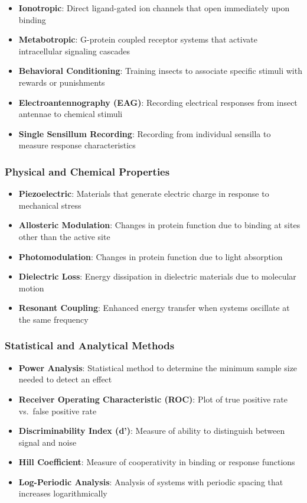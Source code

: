 \documentclass[
  13pt,
  a4paperpaper,
  12pt]{article}
\providecommand{\tightlist}{%
  \setlength{\itemsep}{0pt}\setlength{\parskip}{0pt}}
\begin{document}
\begin{itemize}
\tightlist
\item
  \textbf{Ionotropic}: Direct ligand-gated ion channels that open
  immediately upon binding
\item
  \textbf{Metabotropic}: G-protein coupled receptor systems that
  activate intracellular signaling cascades
\item
  \textbf{Behavioral Conditioning}: Training insects to associate
  specific stimuli with rewards or punishments
\item
  \textbf{Electroantennography (EAG)}: Recording electrical responses
  from insect antennae to chemical stimuli
\item
  \textbf{Single Sensillum Recording}: Recording from individual
  sensilla to measure response characteristics
\end{itemize}

\subsubsection{Physical and Chemical
Properties}\label{physical-and-chemical-properties}

\begin{itemize}
\tightlist
\item
  \textbf{Piezoelectric}: Materials that generate electric charge in
  response to mechanical stress
\item
  \textbf{Allosteric Modulation}: Changes in protein function due to
  binding at sites other than the active site
\item
  \textbf{Photomodulation}: Changes in protein function due to light
  absorption
\item
  \textbf{Dielectric Loss}: Energy dissipation in dielectric materials
  due to molecular motion
\item
  \textbf{Resonant Coupling}: Enhanced energy transfer when systems
  oscillate at the same frequency
\end{itemize}

\subsubsection{Statistical and Analytical
Methods}\label{statistical-and-analytical-methods}

\begin{itemize}
\tightlist
\item
  \textbf{Power Analysis}: Statistical method to determine the minimum
  sample size needed to detect an effect
\item
  \textbf{Receiver Operating Characteristic (ROC)}: Plot of true
  positive rate vs.~false positive rate
\item
  \textbf{Discriminability Index (d')}: Measure of ability to
  distinguish between signal and noise
\item
  \textbf{Hill Coefficient}: Measure of cooperativity in binding or
  response functions
\item
  \textbf{Log-Periodic Analysis}: Analysis of systems with periodic
  spacing that increases logarithmically
\end{itemize}
\end{document}
